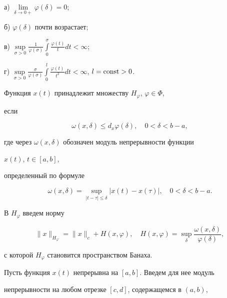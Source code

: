 а) $\lim\limits_{\delta\to0+}\varphi(\delta)=0$;





б) $\varphi(\delta)$ почти возрастает;





в) $\sup\limits_{\sigma>0}\frac{1}{\varphi(\sigma)}


\int\limits^\sigma_0 \frac{\varphi(t)}{t}d t<\infty$;





г) $\sup\limits_{\sigma>0}\frac{\sigma}{\varphi(\sigma)}


\int\limits^l_0\frac{\varphi(t)}{t^2}d t<\infty$, $l=\const>0$.





Функция $x(t)$ принадлежит множеству $H_\varphi$, $\varphi\in\Phi$, 


если 


$$


\omega(x,\delta)\le d_x\varphi(\delta),\quad


0<\delta<b-a,


$$


где через $\omega(x,\delta)$ обозначен модуль непрерывности функции 


$x(t)$, $t\in[a,b]$,


определенный по формуле


$$


\omega(x,\delta)=\sup_{|t-\tau|\le\delta}


|x(t)-x(\tau)|,\quad 0<\delta<b-a.


$$





В $H_\varphi$ введем норму


$$


\|x\|_{H_\varphi}=\|x\|_c+H(x,\varphi),\quad


H(x,\varphi)=\sup_\delta \frac{\omega(x,\delta)}{\varphi(\delta)},


$$


с которой $H_\varphi$ становится пространством Банаха.





Пусть функция $x(t)$ непрерывна на $[a,b]$. Введем для нее модуль 


непрерывности на любом отрезке $[c,d]$, содержащемся в $(a,b)$,


